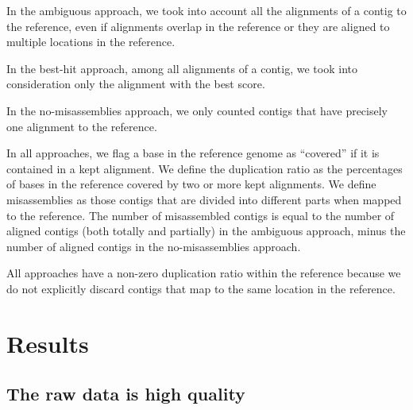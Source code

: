 \documentclass[10pt,a4paper,twocolumn]{article}
\begin{document}



In the ambiguous approach, we took into account all the alignments of
a contig to the reference, even if alignments overlap in the reference
or they are aligned to multiple locations in the reference.

In the best-hit approach, among all alignments of a contig, we took
into consideration only the alignment with the best score.

In the no-misassemblies approach, we only counted contigs that have
precisely one alignment to the reference.

In all approaches, we flag a base in the reference genome as
``covered'' if it is contained in a kept alignment.  We define the
duplication ratio as the percentages of bases in the reference covered
by two or more kept alignments. We define misassemblies as
those contigs that are divided into different parts when mapped to the
reference.  The number of misassembled contigs is equal to the number
of aligned contigs (both totally and partially) in the ambiguous
approach, minus the number of aligned contigs in the no-misassemblies
approach.


All approaches have a non-zero duplication ratio within the reference
because we do not explicitly discard contigs that map to the same
location in the reference.

\section*{Results}

\subsection*{The raw data is high quality}
\end{document}
